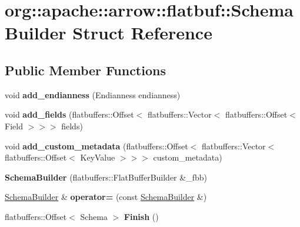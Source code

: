 \hypertarget{structorg_1_1apache_1_1arrow_1_1flatbuf_1_1SchemaBuilder}{}\section{org\+:\+:apache\+:\+:arrow\+:\+:flatbuf\+:\+:Schema\+Builder Struct Reference}
\label{structorg_1_1apache_1_1arrow_1_1flatbuf_1_1SchemaBuilder}
\subsection*{Public Member Functions}
\begin{DoxyCompactItemize}
\item 
void {\bfseries add\+\_\+endianness} (Endianness endianness)\hypertarget{structorg_1_1apache_1_1arrow_1_1flatbuf_1_1SchemaBuilder_a8f312ff22d22eb9467718facfa70dc75}{}\label{structorg_1_1apache_1_1arrow_1_1flatbuf_1_1SchemaBuilder_a8f312ff22d22eb9467718facfa70dc75}

\item 
void {\bfseries add\+\_\+fields} (flatbuffers\+::\+Offset$<$ flatbuffers\+::\+Vector$<$ flatbuffers\+::\+Offset$<$ Field $>$$>$$>$ fields)\hypertarget{structorg_1_1apache_1_1arrow_1_1flatbuf_1_1SchemaBuilder_a6e3fa1cfbeb44865e70b5e819e0eee0d}{}\label{structorg_1_1apache_1_1arrow_1_1flatbuf_1_1SchemaBuilder_a6e3fa1cfbeb44865e70b5e819e0eee0d}

\item 
void {\bfseries add\+\_\+custom\+\_\+metadata} (flatbuffers\+::\+Offset$<$ flatbuffers\+::\+Vector$<$ flatbuffers\+::\+Offset$<$ Key\+Value $>$$>$$>$ custom\+\_\+metadata)\hypertarget{structorg_1_1apache_1_1arrow_1_1flatbuf_1_1SchemaBuilder_a6cfe84076a1adc6593ed4d0319111bf9}{}\label{structorg_1_1apache_1_1arrow_1_1flatbuf_1_1SchemaBuilder_a6cfe84076a1adc6593ed4d0319111bf9}

\item 
{\bfseries Schema\+Builder} (flatbuffers\+::\+Flat\+Buffer\+Builder \&\+\_\+fbb)\hypertarget{structorg_1_1apache_1_1arrow_1_1flatbuf_1_1SchemaBuilder_a45329258142ba05b9b5b6fca9f34f788}{}\label{structorg_1_1apache_1_1arrow_1_1flatbuf_1_1SchemaBuilder_a45329258142ba05b9b5b6fca9f34f788}

\item 
\hyperlink{structorg_1_1apache_1_1arrow_1_1flatbuf_1_1SchemaBuilder}{Schema\+Builder} \& {\bfseries operator=} (const \hyperlink{structorg_1_1apache_1_1arrow_1_1flatbuf_1_1SchemaBuilder}{Schema\+Builder} \&)\hypertarget{structorg_1_1apache_1_1arrow_1_1flatbuf_1_1SchemaBuilder_a1379082df47e404f6825cb7bdfb1c513}{}\label{structorg_1_1apache_1_1arrow_1_1flatbuf_1_1SchemaBuilder_a1379082df47e404f6825cb7bdfb1c513}

\item 
flatbuffers\+::\+Offset$<$ Schema $>$ {\bfseries Finish} ()\hypertarget{structorg_1_1apache_1_1arrow_1_1flatbuf_1_1SchemaBuilder_af3736a722b95aa60e59f08610b12806f}{}\label{structorg_1_1apache_1_1arrow_1_1flatbuf_1_1SchemaBuilder_af3736a722b95aa60e59f08610b12806f}

\end{DoxyCompactItemize}
